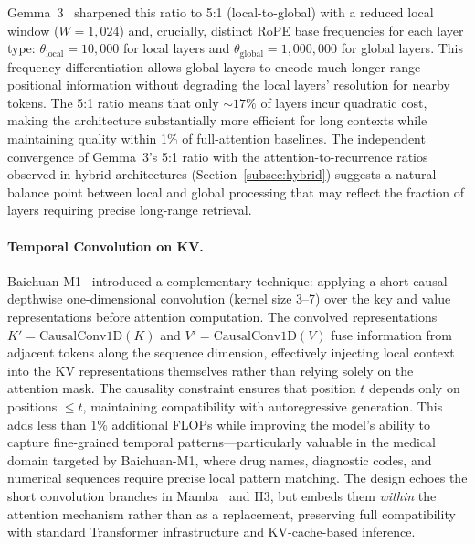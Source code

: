 Gemma~3~\cite{gemma2025gemma3} sharpened this ratio to 5:1 (local-to-global) with a reduced local window ($W = 1{,}024$) and, crucially, distinct RoPE base frequencies for each layer type: $\theta_{\text{local}} = 10{,}000$ for local layers and $\theta_{\text{global}} = 1{,}000{,}000$ for global layers. This frequency differentiation allows global layers to encode much longer-range positional information without degrading the local layers' resolution for nearby tokens. The 5:1 ratio means that only ${\sim}17\%$ of layers incur quadratic cost, making the architecture substantially more efficient for long contexts while maintaining quality within 1\% of full-attention baselines. The independent convergence of Gemma~3's 5:1 ratio with the attention-to-recurrence ratios observed in hybrid architectures (Section~\ref{subsec:hybrid}) suggests a natural balance point between local and global processing that may reflect the fraction of layers requiring precise long-range retrieval.

\paragraph{Temporal Convolution on KV.}
Baichuan-M1~\cite{baichuan2025m1} introduced a complementary technique: applying a short causal depthwise one-dimensional convolution (kernel size 3--7) over the key and value representations before attention computation. The convolved representations $K' = \text{CausalConv1D}(K)$ and $V' = \text{CausalConv1D}(V)$ fuse information from adjacent tokens along the sequence dimension, effectively injecting local context into the KV representations themselves rather than relying solely on the attention mask. The causality constraint ensures that position $t$ depends only on positions $\leq t$, maintaining compatibility with autoregressive generation. This adds less than 1\% additional FLOPs while improving the model's ability to capture fine-grained temporal patterns---particularly valuable in the medical domain targeted by Baichuan-M1, where drug names, diagnostic codes, and numerical sequences require precise local pattern matching. The design echoes the short convolution branches in Mamba~\cite{gu2024mamba} and H3, but embeds them \emph{within} the attention mechanism rather than as a replacement, preserving full compatibility with standard Transformer infrastructure and KV-cache-based inference.

